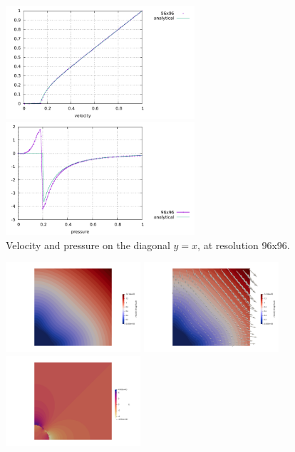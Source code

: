 \begin{center}
\includegraphics[width=7cm]{python_codes/fieldstone_22/results/case5/veldiag}
\includegraphics[width=7cm]{python_codes/fieldstone_22/results/case5/pressbottom}\\
{\captionfont Velocity and pressure on the diagonal $y=x$, at resolution 96x96.} 
\end{center}

\begin{center}
\includegraphics[width=5cm]{python_codes/fieldstone_22/results/case5/vel}
\includegraphics[width=5cm]{python_codes/fieldstone_22/results/case5/vel2}
\includegraphics[width=5cm]{python_codes/fieldstone_22/results/case5/p}\\
\end{center}



